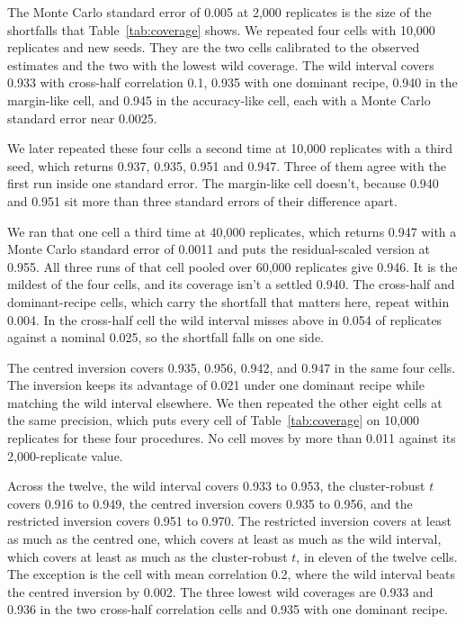 The Monte Carlo standard error of 0.005 at 2,000 replicates is the size of the shortfalls that Table~\ref{tab:coverage} shows. We repeated four cells with 10,000 replicates and new seeds. They are the two cells calibrated to the observed estimates and the two with the lowest wild coverage. The wild interval covers 0.933 with cross-half correlation 0.1, 0.935 with one dominant recipe, 0.940 in the margin-like cell, and 0.945 in the accuracy-like cell, each with a Monte Carlo standard error near 0.0025.

We later repeated these four cells a second time at 10,000 replicates with a third seed, which returns 0.937, 0.935, 0.951 and 0.947. Three of them agree with the first run inside one standard error. The margin-like cell doesn't, because 0.940 and 0.951 sit more than three standard errors of their difference apart.

We ran that one cell a third time at 40,000 replicates, which returns 0.947 with a Monte Carlo standard error of 0.0011 and puts the residual-scaled version at 0.955. All three runs of that cell pooled over 60,000 replicates give 0.946. It is the mildest of the four cells, and its coverage isn't a settled 0.940. The cross-half and dominant-recipe cells, which carry the shortfall that matters here, repeat within 0.004. In the cross-half cell the wild interval misses above in 0.054 of replicates against a nominal 0.025, so the shortfall falls on one side.

The centred inversion covers 0.935, 0.956, 0.942, and 0.947 in the same four cells. The inversion keeps its advantage of 0.021 under one dominant recipe while matching the wild interval elsewhere. We then repeated the other eight cells at the same precision, which puts every cell of Table~\ref{tab:coverage} on 10,000 replicates for these four procedures. No cell moves by more than 0.011 against its 2,000-replicate value.

Across the twelve, the wild interval covers 0.933 to 0.953, the cluster-robust $t$ covers 0.916 to 0.949, the centred inversion covers 0.935 to 0.956, and the restricted inversion covers 0.951 to 0.970. The restricted inversion covers at least as much as the centred one, which covers at least as much as the wild interval, which covers at least as much as the cluster-robust $t$, in eleven of the twelve cells. The exception is the cell with mean correlation 0.2, where the wild interval beats the centred inversion by 0.002. The three lowest wild coverages are 0.933 and 0.936 in the two cross-half correlation cells and 0.935 with one dominant recipe.


